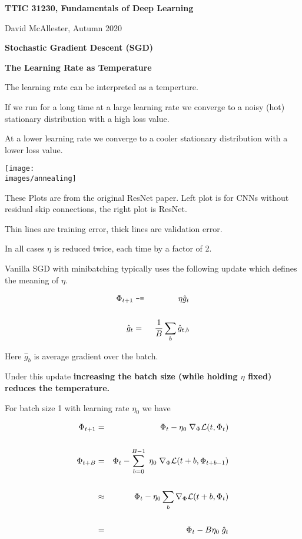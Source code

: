 


\newcommand{\solution}[1]{\bigskip {\bf Solution}: #1}



{\Huge
  \centerline{\bf TTIC 31230, Fundamentals of Deep Learning}
  \bigskip
  \centerline{David McAllester, Autumn 2020}
  \vfill
  \centerline{\bf Stochastic Gradient Descent (SGD)}
  \vfill
  \centerline{\bf The Learning Rate as Temperature}


The learning rate can be interpreted as a temperture.

\vfill
If we run for a long time at a large learning rate we converge to a noisy (hot) stationary distribution with a high loss value.

\vfill
At a lower learning rate we converge to a cooler stationary distribution with a lower loss value.


\centerline{\texttt{[image: \\images/annealing]}}

\vfill
These Plots are from the original ResNet paper.  Left plot is for CNNs without residual skip connections, the right plot is ResNet.

\vfill
Thin lines are training error, thick lines are validation error.

\vfill
In all cases $\eta$ is reduced twice, each time by a factor of 2.


Vanilla SGD with minibatching typically uses the following update which defines the meaning of $\eta$.

\begin{eqnarray*}
\Phi_{t+1} & \;\mbox{\tt -=}\; & \eta \hat{g}_t \\
\\
\hat{g}_t & = & \frac{1}{B} \sum_b \hat{g}_{t,b}
\end{eqnarray*}

\vfill
Here $\hat{g}_{b}$ is average gradient over the batch.

\vfill
Under this update {\bf increasing the batch size (while holding $\eta$ fixed) reduces the temperature.}


For batch size 1 with learning rate $\eta_0$ we have

\begin{eqnarray*}
\Phi_{t+1} & = &  \Phi_{t} - \eta_0\;\nabla_\Phi {\cal L}(t,\Phi_{t}) \\
\\
\Phi_{t+B} & = &  \Phi_{t} - \sum_{b=0}^{B-1} \;\eta_0\;\nabla_\Phi {\cal L}(t+b,\Phi_{t+b-1}) \\
\\
& \approx & \Phi_t - \eta_0 \sum_b \nabla_\Phi {\cal L}(t+b,\Phi_t) \\
\\
& = & \Phi_t - B\eta_0\; \hat{g}_t
\end{eqnarray*}

}
